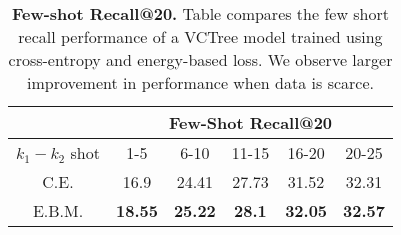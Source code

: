 \documentclass[final]{cvpr}
\begin{document}
\begin{table}[]
\centering
\begin{tabular}{@{}cccccc@{}}
\toprule
\toprule
                       & \multicolumn{5}{c}{Few-Shot Recall@20} \\ \midrule
$k_{1}-k_{2}$ shot & 1-5    & 6-10  & 11-15 & 16-20 & 20-25 \\ \midrule
C.E.                    & 16.9   & 24.41 & 27.73 & 31.52 & 32.31 \\
E.B.M.                & \textbf{18.55}  & \textbf{25.22} & \textbf{28.1}  & \textbf{32.05} & \textbf{32.57} \\
\bottomrule \bottomrule
\end{tabular}
\caption{\textbf{Few-shot Recall@20.} Table compares the few short recall performance of a VCTree \cite{tang2019learning} model trained using cross-entropy and energy-based loss. We observe larger improvement in performance when data is scarce.}
\label{table:kshot}
\vspace{-0.1in}
\end{table}
\begin{table}[t]
\caption{\textbf{Sentence to Graph Retrieval.} We compare the scene graph retrieval performance on gallery of $1000$ and $5000$ images.}
\label{table:sentencetograph}
\vspace{-0.1in}
\end{table}
\end{document}
